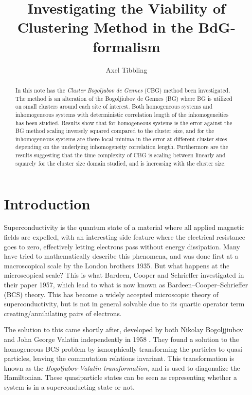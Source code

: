 \documentclass[11pt]{article}
\title{Investigating the Viability of Clustering Method in the BdG-formalism}
\author{Axel Tibbling}
\date{ }
\begin{document}
\maketitle

\begin{abstract}
  In this note has the \textit{Cluster Bogoljubov de Gennes} (CBG) method been investigated. The method is an alteration of the Bogoljiubov de Gennes (BG) where BG is utilized on small clusters around each site of interest. Both homogeneous systems and inhomogeneous systems with deterministic correlation length of the inhomogeneities has been studied. Results show that for homogeneous systems is the error against the BG method scaling inversely squared compared to the cluster size, and for the inhomogeneous systems are there local minima in the error at different cluster sizes depending on the underlying inhomogeneity correlation length. Furthermore are the results suggesting that the time complexity of CBG is scaling between linearly and squarely for the cluster size domain studied, and is increasing with the cluster size. 
\end{abstract}

\section{Introduction}\label{sec:introduction}

Superconductivity is the quantum state of a material where all applied magnetic fields are expelled, with an interesting side feature where the electrical resistance goes to zero, effectively letting electrons pass without energy dissipation. Many have tried to mathematically describe this phenomena, and was done first at a macroscopical scale by the London brothers \cite{londonElectromagneticEquationsSupraconductor} 1935. But what happens at the microscopical scale? This is what Bardeen, Cooper and Schrieffer investigated in their paper \cite{bardeenTheorySuperconductivity1957} 1957, which lead to what is now known as Bardeen–Cooper–Schrieffer (BCS) theory. This has become a widely accepted microscopic theory of superconductivity, but is not in general solvable due to its quartic operator term creating/annihilating pairs of electrons. 

The solution to this came shortly after, developed by both Nikolay Bogoljjiubov and John George Valatin independently in 1958 \cite{valatinCommentsTheorySuperconductivity1958a,bogoljubovNewMethodTheory1958} . They found a solution to the homogeneous BCS problem by ismorphically transforming the particles to quasi particles, leaving the commutation relations invariant. This transformation is known as the \textit{Bogoljubov-Valatin transformation}, and is used to diagonalize the Hamiltonian. These quasiparticle states can be seen as representing whether a system is in a superconducting state or not.  
\end{document}
